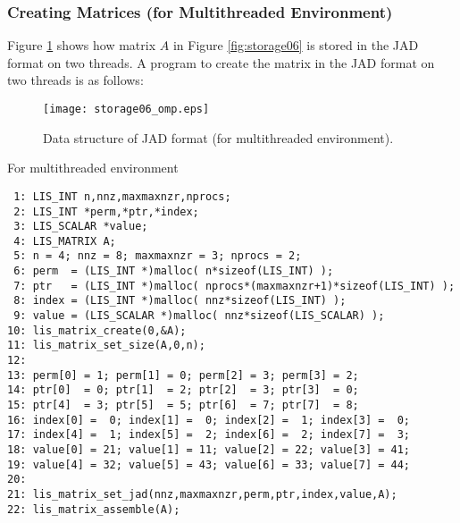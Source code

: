 \documentclass[a4paper]{article}
\begin{document}
\newpage
\subsubsection{Creating Matrices (for Multithreaded Environment)}
Figure \ref{fig:storage06_omp} shows how matrix $A$ in Figure \ref{fig:storage06} is stored in the JAD format on two threads. A program to create the matrix in the JAD format on two threads is as follows:
\begin{figure}[h]
{\centering 
\texttt{[image: storage06\_omp.eps]} 
\caption{Data structure of JAD format (for multithreaded environment).}\label{fig:storage06_omp}}
\end{figure}
\begin{itemsquarebox}[l]{For multithreaded environment}
\small
\begin{verbatim}
 1: LIS_INT n,nnz,maxmaxnzr,nprocs;
 2: LIS_INT *perm,*ptr,*index;
 3: LIS_SCALAR *value;
 4: LIS_MATRIX A;
 5: n = 4; nnz = 8; maxmaxnzr = 3; nprocs = 2;
 6: perm  = (LIS_INT *)malloc( n*sizeof(LIS_INT) );
 7: ptr   = (LIS_INT *)malloc( nprocs*(maxmaxnzr+1)*sizeof(LIS_INT) );
 8: index = (LIS_INT *)malloc( nnz*sizeof(LIS_INT) );
 9: value = (LIS_SCALAR *)malloc( nnz*sizeof(LIS_SCALAR) );
10: lis_matrix_create(0,&A);
11: lis_matrix_set_size(A,0,n);
12:
13: perm[0] = 1; perm[1] = 0; perm[2] = 3; perm[3] = 2;
14: ptr[0]  = 0; ptr[1]  = 2; ptr[2]  = 3; ptr[3]  = 0;
15: ptr[4]  = 3; ptr[5]  = 5; ptr[6]  = 7; ptr[7]  = 8;
16: index[0] =  0; index[1] =  0; index[2] =  1; index[3] =  0;
17: index[4] =  1; index[5] =  2; index[6] =  2; index[7] =  3;
18: value[0] = 21; value[1] = 11; value[2] = 22; value[3] = 41;
19: value[4] = 32; value[5] = 43; value[6] = 33; value[7] = 44;
20:
21: lis_matrix_set_jad(nnz,maxmaxnzr,perm,ptr,index,value,A);
22: lis_matrix_assemble(A);
\end{verbatim}
\end{itemsquarebox}

\newpage
\end{document}
